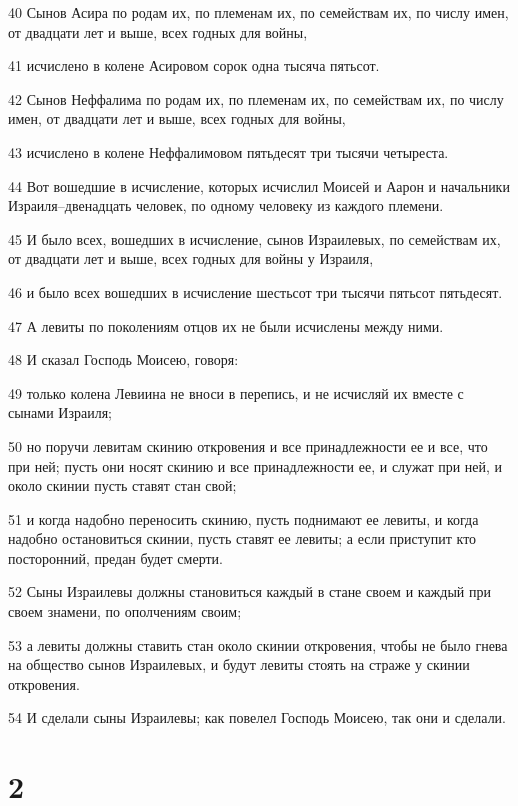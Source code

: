 \par 40 Сынов Асира по родам их, по племенам их, по семействам их, по числу имен, от двадцати лет и выше, всех годных для войны,
\par 41 исчислено в колене Асировом сорок одна тысяча пятьсот.
\par 42 Сынов Неффалима по родам их, по племенам их, по семействам их, по числу имен, от двадцати лет и выше, всех годных для войны,
\par 43 исчислено в колене Неффалимовом пятьдесят три тысячи четыреста.
\par 44 Вот вошедшие в исчисление, которых исчислил Моисей и Аарон и начальники Израиля--двенадцать человек, по одному человеку из каждого племени.
\par 45 И было всех, вошедших в исчисление, сынов Израилевых, по семействам их, от двадцати лет и выше, всех годных для войны у Израиля,
\par 46 и было всех вошедших в исчисление шестьсот три тысячи пятьсот пятьдесят.
\par 47 А левиты по поколениям отцов их не были исчислены между ними.
\par 48 И сказал Господь Моисею, говоря:
\par 49 только колена Левиина не вноси в перепись, и не исчисляй их вместе с сынами Израиля;
\par 50 но поручи левитам скинию откровения и все принадлежности ее и все, что при ней; пусть они носят скинию и все принадлежности ее, и служат при ней, и около скинии пусть ставят стан свой;
\par 51 и когда надобно переносить скинию, пусть поднимают ее левиты, и когда надобно остановиться скинии, пусть ставят ее левиты; а если приступит кто посторонний, предан будет смерти.
\par 52 Сыны Израилевы должны становиться каждый в стане своем и каждый при своем знамени, по ополчениям своим;
\par 53 а левиты должны ставить стан около скинии откровения, чтобы не было гнева на общество сынов Израилевых, и будут левиты стоять на страже у скинии откровения.
\par 54 И сделали сыны Израилевы; как повелел Господь Моисею, так они и сделали.

\chapter{2}

